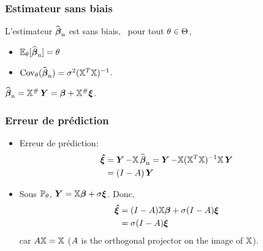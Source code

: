 \begin{frame}
\frametitle{Estimateur sans biais}
\begin{theo}
L'estimateur $\operatorname{\widehat{\boldsymbol{\beta}}_n}$ est sans biais, \ie\ pour tout $\theta \in \Theta$, 
\begin{itemize}
\item $\operatorname{{\mathbb E}}_{\theta}[\operatorname{\widehat{\boldsymbol{\beta}}_n}]= \theta$ 
\item $\mathrm{Cov}_{\theta}(\operatorname{\widehat{\boldsymbol{\beta}}_n})= \sigma^2 (\mathbb{X}^T \mathbb{X})^{-1}$.
\end{itemize}
\end{theo}
\alert{$\operatorname{\widehat{\boldsymbol{\beta}}_n} = \mathbb{X}^{\#} \operatorname{\boldsymbol{Y}}= \boldsymbol{\beta} + \mathbb{X}^{\#} \boldsymbol{\xi}$.}
\end{frame}

\begin{frame}
\frametitle{Erreur de prédiction}
\begin{itemize}
\item \alert{Erreur de prédiction}:
\begin{align*}
\boldsymbol{\hat{\xi}}
&= \operatorname{\boldsymbol{Y}} - \mathbb{X} \operatorname{\widehat{\boldsymbol{\beta}}_n}= \operatorname{\boldsymbol{Y}} - \mathbb{X} (\mathbb{X}^T \mathbb{X})^{-1} \mathbb{X} \operatorname{\boldsymbol{Y}} \\
&= (I - A) \operatorname{\boldsymbol{Y}}
\end{align*}
\item Sous $\operatorname{{\mathbb P}}_\theta$, $\operatorname{\boldsymbol{Y}}= \mathbb{X} \boldsymbol{\beta} +  \sigma \boldsymbol{\xi}$. Donc,
\begin{align*}
\boldsymbol{\hat{\xi}} &= (I-A) \mathbb{X} \boldsymbol{\beta} + \sigma (I-A)  \boldsymbol{\xi} \\
         &= \sigma (I-A) \boldsymbol{\xi}
\end{align*}
car $A \mathbb{X}= \mathbb{X}$ ($A$ is the orthogonal projector on the image of $\mathbb{X}$).
\end{itemize}
\end{frame}

